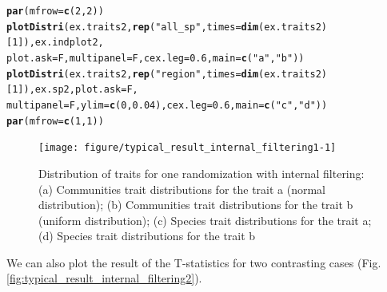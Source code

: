 \documentclass[12pt]{article}\usepackage[]{graphicx}\usepackage[]{color}
\makeatletter
\newcommand{\hlnum}[1]{\textcolor[rgb]{0.686,0.059,0.569}{#1}}%
\newcommand{\hlstr}[1]{\textcolor[rgb]{0.192,0.494,0.8}{#1}}%
\newcommand{\hlstd}[1]{\textcolor[rgb]{0.345,0.345,0.345}{#1}}%
\newcommand{\hlkwc}[1]{\textcolor[rgb]{0.333,0.667,0.333}{#1}}%
\newcommand{\hlkwd}[1]{\textcolor[rgb]{0.737,0.353,0.396}{\textbf{#1}}}%
\newenvironment{kframe}{%
 \def\at@end@of@kframe{}%
 \ifinner\ifhmode%
  \def\at@end@of@kframe{\end{minipage}}%
  \begin{minipage}{\columnwidth}%
 \fi\fi%
 \def\FrameCommand##1{\hskip\@totalleftmargin \hskip-\fboxsep
 \colorbox{shadecolor}{##1}\hskip-\fboxsep
     \hskip-\linewidth \hskip-\@totalleftmargin \hskip\columnwidth}%
 \MakeFramed {\advance\hsize-\width
   \@totalleftmargin\z@ \linewidth\hsize
   \@setminipage}}%
 {\par\unskip\endMakeFramed%
 \at@end@of@kframe}
\newenvironment{knitrout}{}{} %
\makeatother
\begin{document}
\begin{knitrout}\small
{}\color{fgcolor}\begin{kframe}
\begin{alltt}
\hlkwd{par}\hlstd{(}\hlkwc{mfrow}\hlstd{=}\hlkwd{c}\hlstd{(}\hlnum{2}\hlstd{,} \hlnum{2}\hlstd{))}
\hlkwd{plotDistri}\hlstd{(ex.traits2,} \hlkwd{rep}\hlstd{(}\hlstr{"all_sp"}\hlstd{,} \hlkwc{times} \hlstd{=} \hlkwd{dim}\hlstd{(ex.traits2)[}\hlnum{1}\hlstd{]), ex.indplot2,}
           \hlkwc{plot.ask} \hlstd{= F,} \hlkwc{multipanel} \hlstd{= F,} \hlkwc{cex.leg} \hlstd{=} \hlnum{0.6}\hlstd{,} \hlkwc{main}\hlstd{=} \hlkwd{c}\hlstd{(}\hlstr{"a"}\hlstd{,} \hlstr{"b"}\hlstd{))}
\hlkwd{plotDistri}\hlstd{(ex.traits2,} \hlkwd{rep}\hlstd{(}\hlstr{"region"}\hlstd{,} \hlkwc{times} \hlstd{=} \hlkwd{dim}\hlstd{(ex.traits2)[}\hlnum{1}\hlstd{]), ex.sp2,} \hlkwc{plot.ask} \hlstd{= F,}
           \hlkwc{multipanel} \hlstd{= F,} \hlkwc{ylim} \hlstd{=} \hlkwd{c}\hlstd{(}\hlnum{0}\hlstd{,}\hlnum{0.04}\hlstd{),} \hlkwc{cex.leg} \hlstd{=} \hlnum{0.6}\hlstd{,} \hlkwc{main}\hlstd{=} \hlkwd{c}\hlstd{(}\hlstr{"c"}\hlstd{,} \hlstr{"d"}\hlstd{))}
\hlkwd{par}\hlstd{(}\hlkwc{mfrow}\hlstd{=}\hlkwd{c}\hlstd{(}\hlnum{1}\hlstd{,} \hlnum{1}\hlstd{))}
\end{alltt}
\end{kframe}\begin{figure}

{\centering \texttt{[image: figure/typical\_result\_internal\_filtering1-1]} 

}

\caption[Distribution of traits for one randomization with internal filtering]{Distribution of traits for one randomization with internal filtering: (a) Communities trait distributions for the trait a (normal distribution); (b) Communities trait distributions for the trait b (uniform distribution); (c) Species trait distributions for the trait a; (d) Species trait distributions for the trait b\label{fig:typical_result_internal_filtering1}}
\end{figure}


\end{knitrout}

We can also plot the result of the T-statistics for two contrasting cases (Fig. \ref{fig:typical_result_internal_filtering2}).
\end{document}
